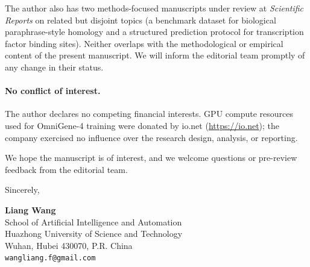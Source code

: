 \documentclass[11pt]{article}
\begin{document}
The author also has two methods-focused manuscripts under review at \textit{Scientific Reports} on related but disjoint topics (a benchmark dataset for biological paraphrase-style homology and a structured prediction protocol for transcription factor binding sites). Neither overlaps with the methodological or empirical content of the present manuscript. We will inform the editorial team promptly of any change in their status.

\paragraph{No conflict of interest.}
The author declares no competing financial interests. GPU compute resources used for OmniGene-4 training were donated by io.net (\url{https://io.net}); the company exercised no influence over the research design, analysis, or reporting.

We hope the manuscript is of interest, and we welcome questions or pre-review feedback from the editorial team.

\medskip

Sincerely,

\medskip

\textbf{Liang Wang}\\
School of Artificial Intelligence and Automation\\
Huazhong University of Science and Technology\\
Wuhan, Hubei 430070, P.R. China\\
\texttt{wangliang.f@gmail.com}
\end{document}
